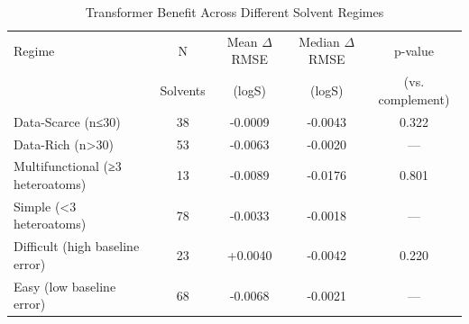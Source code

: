 
\begin{table}[htbp]
\centering
\caption{Transformer Benefit Across Different Solvent Regimes}
\label{tab:transformer_regimes}
\begin{tabular}{lcccc}
\toprule
Regime & N & Mean $\Delta$RMSE & Median $\Delta$RMSE & p-value \\
       & Solvents & (logS) & (logS) & (vs. complement) \\
\midrule
Data-Scarce (n≤30) & 38 & -0.0009 & -0.0043 & 0.322 \\
Data-Rich (n>30) & 53 & -0.0063 & -0.0020 & — \\
Multifunctional (≥3 heteroatoms) & 13 & -0.0089 & -0.0176 & 0.801 \\
Simple (<3 heteroatoms) & 78 & -0.0033 & -0.0018 & — \\
Difficult (high baseline error) & 23 & +0.0040 & -0.0042 & 0.220 \\
Easy (low baseline error) & 68 & -0.0068 & -0.0021 & — \\
\bottomrule
\end{tabular}
\end{table}
